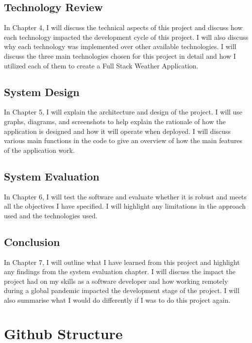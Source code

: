\subsection{Technology Review}
In Chapter 4, I will discuss the technical aspects of this project and discuss how each technology impacted the development cycle of this project. I will also discuss why each technology was implemented over other available technologies. I will discuss the three main technologies chosen for this project in detail and how I utilized each of them to create a Full Stack Weather Application. 

\subsection{System Design}
In Chapter 5, I will explain the architecture and design of the project. I will use graphs, diagrams, and screenshots to help explain the rationale of how the application is designed and how it will operate when deployed. I will discuss various main functions in the code to give an overview of how the main features of the application work.

\subsection{System Evaluation}
In Chapter 6, I will test the software and evaluate whether it is robust and meets all the objectives I have specified. I will highlight any limitations in the approach used and the technologies used.

\subsection{Conclusion}
In Chapter 7, I will outline what I have learned from this project and highlight any findings from the system evaluation chapter. I will discuss the impact the project had on my skills as a software developer and how working remotely during a global pandemic impacted the development stage of the project. I will also summarise what I would do differently if I was to do this project again.

\section{Github Structure}

